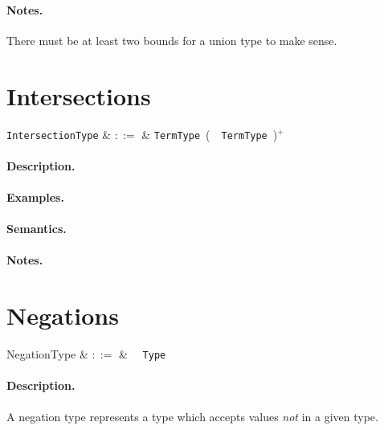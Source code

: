 \paragraph{Notes.}  There must be at least two bounds for a union type to make sense.


\section{Intersections}

\begin{syntax}
  \verb+IntersectionType+ & $::=$ & \verb+TermType+\ \big(\ \token{\&}\ \verb+TermType+\
  \big)$^+$\\
\end{syntax}

\paragraph{Description.}

\paragraph{Examples.}

\paragraph{Semantics.}

\paragraph{Notes.}


\section{Negations}

\begin{syntax}
  NegationType & $::=$ & \token{!}\ \ \verb+Type+\\
\end{syntax}

\paragraph{Description.}  A negation type represents a type which
accepts values {\em not} in a given type.

